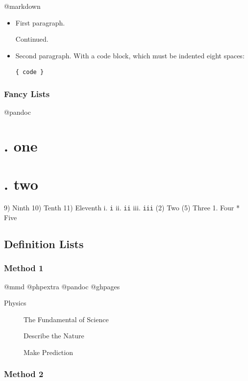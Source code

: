 @markdown

\begin{itemize}
\item First paragraph.

Continued.

\item Second paragraph. With a code block, which must be indented
eight spaces:

\begin{verbatim}
{ code }
\end{verbatim}

\end{itemize}

\subsection{Fancy Lists}
\label{fancylists}

@pandoc

\chapter{. one}
\label{.one}

\chapter{. two}
\label{.two}

9) Ninth
10) Tenth
11) Eleventh
 i. \texttt{i}
 ii. \texttt{ii}
 iii. \texttt{iii}
(2) Two
(5) Three
1. Four
* Five

\section{Definition Lists}
\label{definitionlists}

\subsection{Method 1}
\label{method1}

@mmd @phpextra @pandoc @ghpages

\begin{description}

\item[Physics]

The Fundamental of Science

Describe the Nature

Make Prediction
\end{description}

\subsection{Method 2}
\label{method2}

